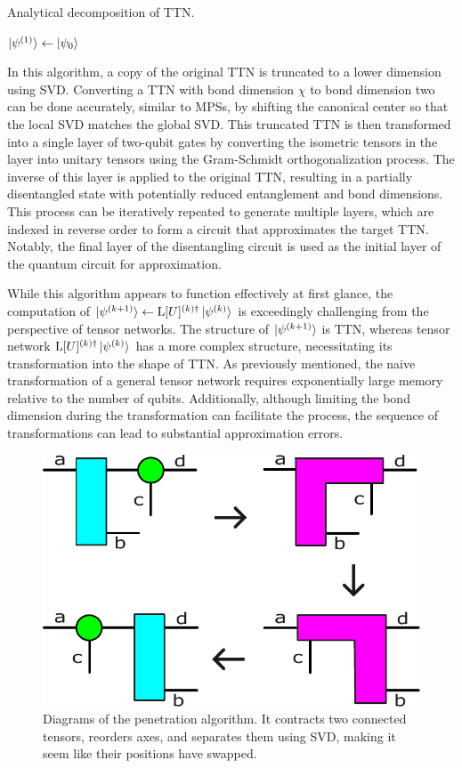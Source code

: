 \documentclass[12pt,dvipdfmx,twoside,openright]{report}
\begin{document}
\begin{algorithm}[tbp]
 \caption{Analytical decomposition of TTN.}
 \label{algorithm:decomposition}
 $\ket{\psi^{(1)}} \leftarrow{\ket{\psi_0}}$\;
\end{algorithm}

In this algorithm, a copy of the original TTN is truncated to a lower dimension using SVD.
Converting a TTN with bond dimension $\chi$ to bond dimension two can be done accurately, similar to MPSs, by shifting the canonical center so that the local SVD matches the global SVD.
This truncated TTN is then transformed into a single layer of two-qubit gates by converting the isometric tensors in the layer into unitary tensors using the Gram-Schmidt orthogonalization process.
 The inverse of this layer is applied to the original TTN, resulting in a partially disentangled state with potentially reduced entanglement and bond dimensions.
This process can be iteratively repeated to generate multiple layers, which are indexed in reverse order to form a circuit that approximates the target TTN. 
Notably, the final layer of the disentangling circuit is used as the initial layer of the quantum circuit for approximation.

While this algorithm appears to function effectively at first glance, the computation of $\ket{\psi^{(k+1)}} \leftarrow{\mathrm{L}[U]^{(k)\dagger}}\ket{\psi^{(k)}}$ is exceedingly challenging from the perspective of tensor networks.
The structure of $\ket{\psi^{(k+1)}}$ is TTN, whereas tensor network $\mathrm{L}[U]^{(k)\dagger}\ket{\psi^{(k)}}$ has a more complex structure, necessitating its transformation into the shape of TTN.
As previously mentioned, the naive transformation of a general tensor network requires exponentially large memory relative to the number of qubits.
Additionally, although limiting the bond dimension during the transformation can facilitate the process, the sequence of transformations can lead to substantial approximation errors.

\begin{figure}
    \centering
    \includegraphics[width=0.6\linewidth]{fig-decomposition-b.pdf}
    \caption{Diagrams of the penetration algorithm. It contracts two connected tensors, reorders axes, and separates them using SVD, making it seem like their positions have swapped.
    }
    \label{fig:decomposition-b}
\end{figure}
\end{document}

